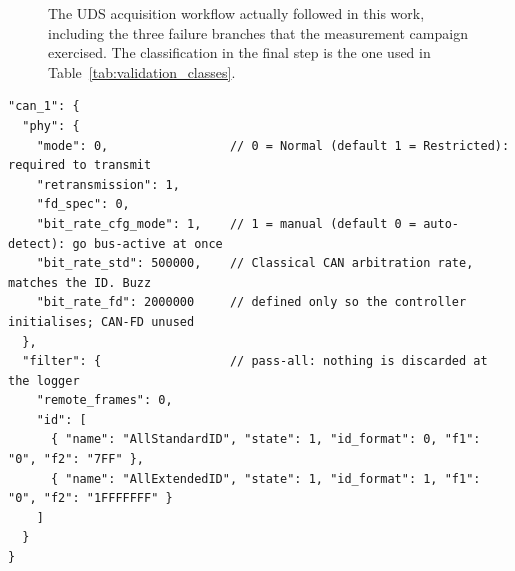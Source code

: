 \begin{figure}[H]
\caption[UDS acquisition and decoding workflow]{The UDS acquisition workflow actually followed in
this work, including the three failure branches that the measurement campaign exercised. The
classification in the final step is the one used in Table~\ref{tab:validation_classes}.}
\label{fig:uds_flow}
\end{figure}


\begin{lstlisting}[caption={[CANedge2 PHY settings]Physical-layer settings of channel~1, verbatim from the deployed
\texttt{config-01.08.json}. The factory default is restricted (listen-only) mode with
auto bit-rate detection, which never lets the controller transmit.},label={lst:canedge_cfg}]
"can_1": {
  "phy": {
    "mode": 0,                 // 0 = Normal (default 1 = Restricted): required to transmit
    "retransmission": 1,
    "fd_spec": 0,
    "bit_rate_cfg_mode": 1,    // 1 = manual (default 0 = auto-detect): go bus-active at once
    "bit_rate_std": 500000,    // Classical CAN arbitration rate, matches the ID. Buzz
    "bit_rate_fd": 2000000     // defined only so the controller initialises; CAN-FD unused
  },
  "filter": {                  // pass-all: nothing is discarded at the logger
    "remote_frames": 0,
    "id": [
      { "name": "AllStandardID", "state": 1, "id_format": 0, "f1": "0", "f2": "7FF" },
      { "name": "AllExtendedID", "state": 1, "id_format": 1, "f1": "0", "f2": "1FFFFFFF" }
    ]
  }
}
\end{lstlisting}

